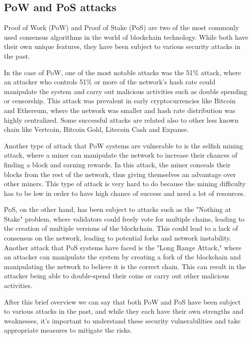 \documentclass[target=mst,aauheader=]{thud}
\begin{document}
    \subsection{PoW and PoS attacks}

    Proof of Work (PoW) and Proof of Stake (PoS) are two of the most commonly used consensus algorithms in the world of blockchain technology. While both have their own unique features, they have been subject to various security attacks in the past.\par

    In the case of PoW, one of the most notable attacks was the 51\% attack, where an attacker who controls 51\% or more of the network's hash rate could manipulate the system and carry out malicious activities such as double spending or censorship. This attack was prevalent in early cryptocurrencies like Bitcoin and Ethereum, where the network was smaller and hash rate distribution was highly centralized. Some successful attacks are related also to other less known chain like Vertcoin\cite{VTC51Attack}, Bitcoin Gold\cite{BTCG51Attack}, Litecoin Cash\cite{LCC51Attack} and Expanse\cite{EXP51Attack}.\par
    Another type of attack that PoW systems are vulnerable to is the selfish mining attack, where a miner can manipulate the network to increase their chances of finding a block and earning rewards. In this attack, the miner conceals their blocks from the rest of the network, thus giving themselves an advantage over other miners. This type of attack is very hard to do because the mining difficulty has to be low in order to have high chance of success and need a lot of resources\cite{SelfishMiningDefinition}.\par
    PoS, on the other hand, has been subject to attacks such as the "Nothing at Stake" problem\cite{NothingAtStake}, where validators could freely vote for multiple chains, leading to the creation of multiple versions of the blockchain. This could lead to a lack of consensus on the network, leading to potential forks and network instability.
    Another attack that PoS systems have faced is the "Long Range Attack,"\cite{LongRangeAttack} where an attacker can manipulate the system by creating a fork of the blockchain and manipulating the network to believe it is the correct chain. This can result in the attacker being able to double-spend their coins or carry out other malicious activities.

    After this brief overview we can say that both PoW and PoS have been subject to various attacks in the past, and while they each have their own strengths and weaknesses, it's important to understand these security vulnerabilities and take appropriate measures to mitigate the risks.
\end{document}
